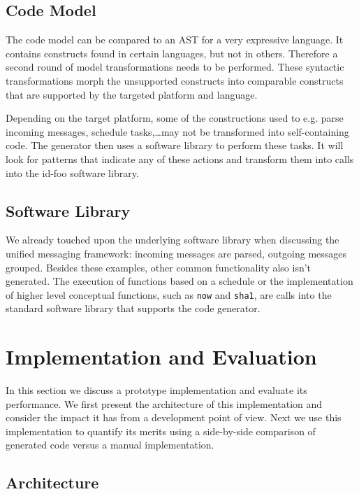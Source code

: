 \documentclass[conference]{IEEEtran}
\newcommand{\NAME}{id-foo\xspace}
\begin{document}
\subsection{Code Model}

The code model can be compared to an AST for a very expressive language. It
contains constructs found in certain languages, but not in others. Therefore a
second round of model transformations needs to be performed. These syntactic
transformations morph the unsupported constructs into comparable constructs
that are supported by the targeted platform and language.

Depending on the target platform, some of the constructions used to e.g. parse
incoming messages, schedule tasks,\dots may not be transformed into
self-containing code. The generator then uses a software library to perform
these tasks. It will look for patterns that indicate any of these actions and
transform them into calls into the \NAME software library.

\subsection{Software Library}

We already touched upon the underlying software library when discussing the
unified messaging framework: incoming messages are parsed, outgoing messages
grouped. Besides these examples, other common functionality also isn't
generated. The execution of functions based on a schedule or the implementation
of higher level conceptual functions, such as \texttt{now} and \texttt{sha1},
are calls into the standard software library that supports the code generator.

\section{Implementation and Evaluation}
\label{evaluation}

In this section we discuss a prototype implementation and evaluate its
performance. We first present the architecture of this implementation and
consider the impact it has from a development point of view. Next we use this
implementation to quantify its merits using a side-by-side comparison of
generated code versus a manual implementation.

\subsection{Architecture}
\end{document}
